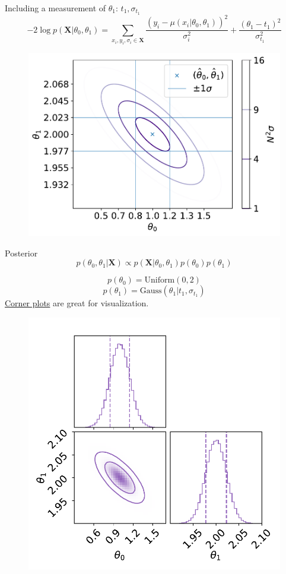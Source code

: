 \documentclass[
aspectratio=169,
14pt,
professionalfonts
]{beamer}
\begin{document}
\begin{frame}{Including a measurement of $\theta_1$: $t_1, \sigma_{t_1}$}
\vspace{-1cm}
    $$ -2\log p(\boldsymbol{X}|\theta_0, \theta_1) = \sum_{x_i, y_i,\sigma_i \in \boldsymbol{X}}\frac{\left(y_i -\mu(x_i|\theta_0, \theta_1)\right)^2}{\sigma_i^2} + \frac{\left(\theta_1 -t_1\right)^2}{\sigma_{t_1}^2} $$
    \begin{figure}
        \centering
        \includegraphics[width=0.5\linewidth]{../plots/nll_constr.pdf}
    \end{figure}
\end{frame}

\begin{frame}{Posterior}
\vspace{-1cm}
    $$p(\theta_0, \theta_1|\boldsymbol{X}) \propto p(\boldsymbol{X}|\theta_0, \theta_1) p(\theta_0)p(\theta_1)$$
    \begin{minipage}{0.4\linewidth}
        $$p(\theta_0) = \text{Uniform}(0,2)$$
        $$p(\theta_1) = \text{Gauss}(\theta_1 | t_1, \sigma_{t_1})$$
        \href{https://corner.readthedocs.io/en/latest/}{Corner plots} are great for visualization.
    \end{minipage}
    \begin{minipage}{0.59\linewidth}
    \begin{figure}
        \centering
        \includegraphics[width=0.8\linewidth]{../plots/posterior.pdf}
    \end{figure}
    \end{minipage}
\end{frame}
\end{document}
